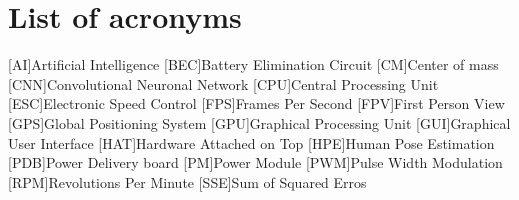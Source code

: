 \chapter*{List of acronyms}
\begin{acronym} 
    [AI]{Artificial Intelligence}
    [BEC]{Battery Elimination Circuit}
    [CM]{Center of mass}
    [CNN]{Convolutional Neuronal Network}
    [CPU]{Central Processing Unit}
    [ESC]{Electronic Speed Control}
    [FPS]{Frames Per Second}
    [FPV]{First Person View}
    [GPS]{Global Positioning System}
    [GPU]{Graphical Processing Unit}
    [GUI]{Graphical User Interface}
    [HAT]{Hardware Attached on Top}
    [HPE]{Human Pose Estimation}
    [PDB]{Power Delivery board}
    [PM]{Power Module}
    [PWM]{Pulse Width Modulation}
    [RPM]{Revolutions Per Minute}
    [SSE]{Sum of Squared Erros}
\end{acronym}